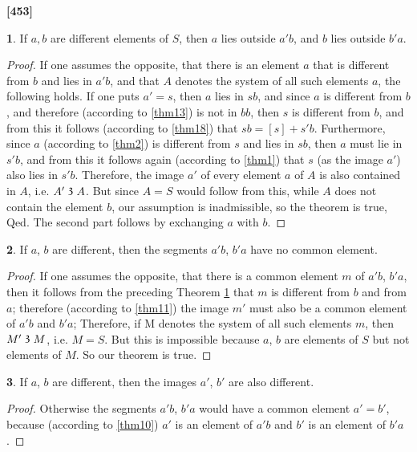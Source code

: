 \documentclass[leqno,hidelinks,a4paper]{article}
\theoremstyle{definition}
\newtheorem{satz}{\protect\satzname}
\newcommand{\satzname}{}
\renewcommand{\satzname}{\hspace{-4pt}.\ Satz}%
\renewcommand{\satzname}{\hspace{-4pt}.\ Theorem}%
\newcommand\partof{\mathrel{\raisebox{0.45ex}{$\mathfrak{3}$}}}
\begin{document}
\noindent \textbf{[453]}

\begin{satz}\label{thm19}
If $a, b$ are different elements of $S$, then $a$ lies outside $a'b$, and $b$ lies outside $b'a$.\end{satz}

\begin{proof}
If one assumes the opposite, that there is an element $a$ that is different from $b$ and lies in $a'b$, and that $A$ denotes the system of all such elements $a$, the following holds.
If one puts $a'=s$, then $a$ lies in $sb$, and since $a$ is different from $b$, and therefore (according to \ref{thm13}) is not in $bb$, then $s$ is different from $b$, and from this it follows (according to \ref{thm18}) that $sb = [s] + s 'b$.
Furthermore, since $a$ (according to \ref{thm2}) is different from $s$ and lies in $sb$, then $a$ must lie in $s'b$, and from this it follows again (according to \ref{thm1}) that $s$ (as the image $a'$) also lies in $s'b$.
Therefore, the image $a'$ of every element $a$ of $A$ is also contained in $A$, i.e. $A' \partof A$.
But since $A=S$ would follow from this, while $A$ does not contain the element $b$, our assumption is inadmissible, so the theorem is true, Qed.
The second part follows by exchanging $a$ with $b$.\end{proof}

\begin{satz}\label{thm20}
If $a$, $b$ are different, then the segments $a'b$, $b'a$ have no common element.
\end{satz}

\begin{proof}
If one assumes the opposite, that there is a common element $m$ of $a'b$, $b'a$, then it follows from the preceding Theorem \ref{thm19} that $m$ is different from $b$ and from $a$; therefore (according to \ref{thm11}) the image $m'$ must also be a common element of $a'b$ and $b'a$;
Therefore, if M denotes the system of all such elements $m$, then $M' \partof M$, i.e. $M=S$. But this is impossible because $a$, $b$ are elements of $S$ but not elements of $M$. So our theorem is true.
\end{proof}

\begin{satz}\label{thm21}
If $a$, $b$ are different, then the images $a'$, $b'$ are also different.
\end{satz}

\begin{proof}
Otherwise the segments $a'b$, $b'a$ would have a common element $a'=b'$, because (according to \ref{thm10}) $a'$ is an element of $a'b$ and $b'$ is an element of $b'a$.
\end{proof}
\end{document}
